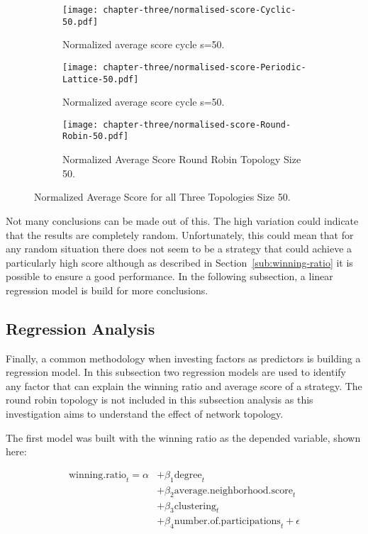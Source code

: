 \begin{figure}[H]
\centering
    \begin{subfigure}[t]{1\textwidth}
    \centering
        \texttt{[image: chapter-three/normalised-score-Cyclic-50.pdf]}
    \caption{Normalized average score cycle s=50.}
    \end{subfigure}
\hfill
    \begin{subfigure}[t]{1\textwidth}\centering
    \centering
        \texttt{[image: chapter-three/normalised-score-Periodic-Lattice-50.pdf]}
    \caption{Normalized average score cycle s=50.}
    \end{subfigure}
\hfill
    \begin{subfigure}[t]{1\textwidth}\centering
    \centering
        \texttt{[image: chapter-three/normalised-score-Round-Robin-50.pdf]}
    \caption{Normalized Average Score Round Robin Topology Size 50.}
    \end{subfigure}
\caption{Normalized Average Score for all Three Topologies Size 50.}
\label{fig:average-score-fifty}
\end{figure}

Not many conclusions can be made out of this. The high variation could indicate
that the results are completely random. Unfortunately, this could mean that for
any random situation there does not seem to be a strategy that could
achieve a particularly high score although as described in Section~\ref{sub:winning-ratio}
it is possible to ensure a good performance. In the following subsection, a linear
regression model is build for more conclusions.


\subsection{Regression Analysis}
\label{sub:regression}
Finally, a common methodology when investing factors as predictors is building a
regression model. In this subsection two regression models are used to identify
any
factor that can explain the winning ratio and average score of a strategy.
The round robin topology is not included in this subsection analysis as this
investigation aims to understand the effect of network topology.

The first model was built with the winning ratio as the depended variable,
shown here:

\begin{align}
\mathrm{winning.ratio}_{t} = \alpha
    &+ \beta_{1}  \mathrm{degree}_{t} \\
    &+ \beta_{2}  \mathrm{average.neighborhood.score}_{t}    \\
    &+ \beta_{3}  \mathrm{clustering}_{t} \\
    &+ \beta_{4}  \mathrm{number.of.participations}_{t} + \epsilon
\end{align}


